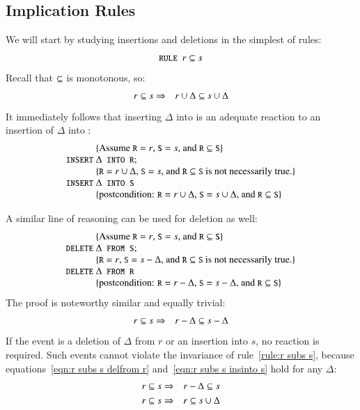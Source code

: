 \documentclass{elsarticle}
\begin{document}
\subsection{Implication Rules}
\label{ssct:Implication Rules}
	We will start by studying insertions and deletions in the simplest of rules:
\begin{equation}
\text{\tt\small RULE }r\subseteq s\label{rule:r subs s}
\end{equation}
	Recall that $\subseteq$ is monotonous, so:
\begin{eqnarray}
r\subseteq s&\Rightarrow&r\cup\Delta\subseteq s\cup \Delta\label{eqn:r subs s}
\end{eqnarray}
	It immediately follows that inserting $\Delta$ into  is an adequate reaction to
	an insertion of $\Delta$ into :
\[\begin{array}{r@{~}l}
&\{\text{Assume $\code{R}=r$, $\code{S}=s$, and $\code{R}\subs\code{S}$}\}\\
\code{INSERT}&\Delta\code{ INTO R};\\
&\{\text{$\code{R}=r\cup\Delta$, $\code{S}=s$, and $\code{R}\subs\code{S}$ is not necessarily true.}\}\\
\code{INSERT}&\Delta\code{ INTO S}\\
&\{\text{postcondition: $\code{R}=r\cup\Delta$, $\code{S}=s\cup\Delta$, and $\code{R}\subs\code{S}$}\}
\end{array}\]

	A similar line of reasoning can be used for deletion as well:
\[\begin{array}{r@{~}l}
&\{\text{Assume $\code{R}=r$, $\code{S}=s$, and $\code{R}\subs\code{S}$}\}\\
\code{DELETE}&\Delta\code{ FROM S};\\
&\{\text{$\code{R}=r$, $\code{S}=s-\Delta$, and $\code{R}\subs\code{S}$ is not necessarily true.}\}\\
\code{DELETE}&\Delta\code{ FROM R}\\
&\{\text{postcondition: $\code{R}=r-\Delta$, $\code{S}=s-\Delta$, and $\code{R}\subs\code{S}$}\}
\end{array}\]
	The proof is noteworthy similar and equally trivial:
\begin{eqnarray}
r\subseteq s&\Rightarrow&r-\Delta\subseteq s-\Delta\label{eqn:r subs s by deletion}
\end{eqnarray}
	If the event is a deletion of $\Delta$ from $r$ or an insertion into $s$, no reaction is required.
	Such events cannot violate the invariance of rule~\ref{rule:r subs s},
	because equations~\ref{eqn:r subs s delfrom r} and~\ref{eqn:r subs s insinto s} hold for any $\Delta$:
\begin{eqnarray}
r\subseteq s&\Rightarrow&r-\Delta\subseteq s\label{eqn:r subs s delfrom r}\\
r\subseteq s&\Rightarrow&r\subseteq s\cup\Delta\label{eqn:r subs s insinto s}
\end{eqnarray}
\end{document}
